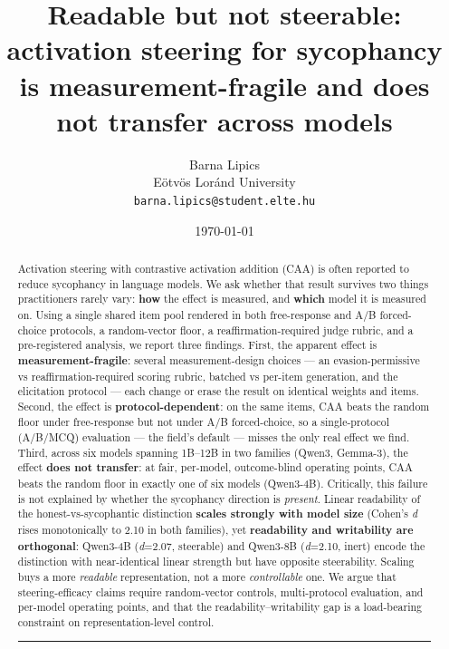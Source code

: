 \documentclass[11pt]{article}
\title{Readable but not steerable: activation steering for sycophancy is measurement-fragile and does not transfer across models}
\author{Barna Lipics\\ E\"otv\"os Lor\'and University\\ \texttt{barna.lipics@student.elte.hu}}
\date{\today}
\begin{document}
\maketitle
\begin{abstract}
Activation steering with contrastive activation addition (CAA) is often reported to reduce
sycophancy in language models. We ask whether that result survives two things practitioners rarely
vary: \textbf{how} the effect is measured, and \textbf{which} model it is measured on. Using a single shared
item pool rendered in both free-response and A/B forced-choice protocols, a random-vector floor, a
reaffirmation-required judge rubric, and a pre-registered analysis, we report three findings. First,
the apparent effect is \textbf{measurement-fragile}: several measurement-design choices --- an
evasion-permissive vs reaffirmation-required scoring rubric, batched vs per-item generation, and the
elicitation protocol --- each change or erase the result on identical weights and items. Second, the
effect is \textbf{protocol-dependent}: on the
same items, CAA beats the random floor under free-response but not under A/B forced-choice, so a
single-protocol (A/B/MCQ) evaluation --- the field's default --- misses the only real effect we find.
Third, across six models spanning 1B--12B in two families (Qwen3, Gemma-3), the effect \textbf{does not
transfer}: at fair, per-model, outcome-blind operating points, CAA beats the random floor in exactly
one of six models (Qwen3-4B). Critically, this failure is not explained by whether the sycophancy
direction is \emph{present}. Linear readability of the honest-vs-sycophantic distinction \textbf{scales
strongly with model size} (Cohen's \emph{d} rises monotonically to 2.10 in both families), yet
\textbf{readability and writability are orthogonal}: Qwen3-4B (\emph{d}=2.07, steerable) and Qwen3-8B
(\emph{d}=2.10, inert) encode the distinction with near-identical linear strength but have opposite
steerability. Scaling buys a more \emph{readable} representation, not a more \emph{controllable} one. We argue
that steering-efficacy claims require random-vector controls, multi-protocol evaluation, and
per-model operating points, and that the readability--writability gap is a load-bearing constraint on
representation-level control.

\begin{center}\rule{0.5\linewidth}{0.5pt}\end{center}

\end{abstract}
\end{document}
